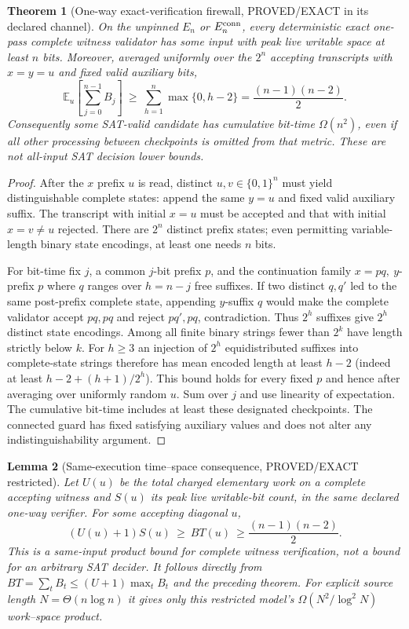 \documentclass[11pt]{article}
\newtheorem{theorem}{Theorem}
\newtheorem{lemma}[theorem]{Lemma}
\begin{document}
\begin{theorem}[One-way exact-verification firewall, PROVED/EXACT in its declared channel]
On the unpinned $E_n$ or $E_n^{\rm conn}$, every deterministic exact one-pass complete witness validator has some input with peak live writable space at least $n$ bits. Moreover, averaged uniformly over the $2^n$ accepting transcripts with $x=y=u$ and fixed valid auxiliary bits,
\[
 {\mathbb E}_u\left[\sum_{j=0}^{n-1}B_j\right]\ \ge\
 \sum_{h=1}^{n}\max\{0,h-2\}
 =\frac{(n-1)(n-2)}2.
\]
Consequently some SAT-valid candidate has cumulative bit-time $\Omega(n^2)$, even if all other processing between checkpoints is omitted from that metric. These are not all-input SAT decision lower bounds.
\end{theorem}
\begin{proof}
After the $x$ prefix $u$ is read, distinct $u,v\in\{0,1\}^n$ must yield distinguishable complete states: append the same $y=u$ and fixed valid auxiliary suffix. The transcript with initial $x=u$ must be accepted and that with initial $x=v\ne u$ rejected. There are $2^n$ distinct prefix states; even permitting variable-length binary state encodings, at least one needs $n$ bits.

For bit-time fix $j$, a common $j$-bit prefix $p$, and the continuation family $x=pq,\ y$-prefix $p$ where $q$ ranges over $h=n-j$ free suffixes. If two distinct $q,q'$ led to the same post-prefix complete state, appending $y$-suffix $q$ would make the complete validator accept $pq,pq$ and reject $pq',pq$, contradiction. Thus $2^h$ suffixes give $2^h$ distinct state encodings. Among all finite binary strings fewer than $2^k$ have length strictly below $k$. For $h\ge3$ an injection of $2^h$ equidistributed suffixes into complete-state strings therefore has mean encoded length at least $h-2$ (indeed at least $h-2+(h+1)/2^h$). This bound holds for every fixed $p$ and hence after averaging over uniformly random $u$. Sum over $j$ and use linearity of expectation. The cumulative bit-time includes at least these designated checkpoints. The connected guard has fixed satisfying auxiliary values and does not alter any indistinguishability argument.
\end{proof}

\begin{lemma}[Same-execution time--space consequence, PROVED/EXACT restricted]
Let $U(u)$ be the total charged elementary work on a complete accepting witness and $S(u)$ its peak live writable-bit count, in the same declared one-way verifier. For some accepting diagonal $u$,
\[
 (U(u)+1)S(u)\ \ge\ BT(u)\ \ge\frac{(n-1)(n-2)}2.
\]
This is a same-input product bound for \emph{complete witness verification}, not a bound for an arbitrary SAT decider. It follows directly from $BT=\sum_tB_t\le(U+1)\max_tB_t$ and the preceding theorem. For explicit source length $N=\Theta(n\log n)$ it gives only this restricted model's $\Omega(N^2/\log^2N)$ work--space product.
\end{lemma}
\end{document}

